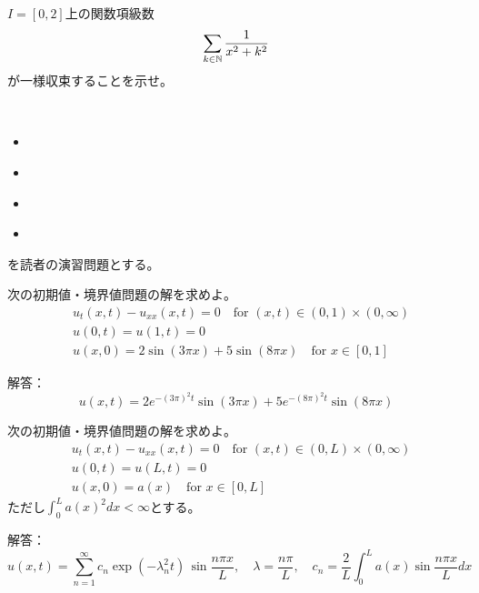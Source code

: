 \documentclass[report]{jlreq}
\begin{document}
\begin{problem}
    $I = [0, 2]$上の関数項級数
    \begin{equation}
        \sum_{k \in \mathbb{N}} \frac{1}{x^2 + k^2}
    \end{equation}
    が一様収束することを示せ。
\end{problem}

\begin{problem}
    \,
    \begin{itemize}
        \item \cite[第III章 例題6.1.1]{杉浦+89}
        \item \cite[第III章 問6.1.2 (2)]{杉浦+89}
        \item \cite[第III章 例題6.2.1]{杉浦+89}
        \item \cite[第III章 問6.2.1 (1),(2)]{杉浦+89}
    \end{itemize}
    を読者の演習問題とする。
\end{problem}

\begin{problem}
    次の初期値・境界値問題の解を求めよ。
    \begin{equation}
        \begin{split}
            &u_t(x, t) - u_{xx}(x, t) = 0 \quad \text{for $(x, t) \in (0, 1) \times (0, \infty)$} \\
            &u(0, t) = u(1, t) = 0 \\
            &u(x, 0) = 2 \sin(3\pi x) + 5 \sin(8\pi x) \quad \text{for $x \in [0, 1]$}
        \end{split}
    \end{equation}

    解答：
    \begin{equation}
        u(x, t) = 2 e^{-(3\pi)^2 t} \sin(3\pi x) + 5 e^{-(8\pi)^2 t} \sin(8\pi x)
    \end{equation}
\end{problem}

\begin{problem}
    次の初期値・境界値問題の解を求めよ。
    \begin{equation}
        \begin{split}
            &u_t(x, t) - u_{xx}(x, t) = 0 \quad \text{for $(x, t) \in (0, L) \times (0, \infty)$} \\
            &u(0, t) = u(L, t) = 0 \\
            &u(x, 0) = a(x) \quad \text{for $x \in [0, L]$}
        \end{split}
    \end{equation}
    ただし$\int_0^L a(x)^2 dx < \infty$とする。

    解答：
    \begin{equation}
        u(x, t) = \sum_{n=1}^\infty c_n \exp(-\lambda_n^2 t)\, \sin \frac{n\pi x}{L},\quad
        \lambda = \frac{n\pi}{L},\quad
        c_n = \frac{2}{L} \int_0^L a(x) \sin\frac{n\pi x}{L} dx
    \end{equation}
\end{problem}
\end{document}
